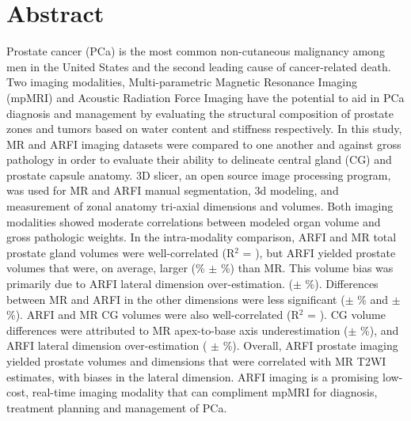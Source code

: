 \section*{Abstract}
Prostate cancer (PCa) is the most common non-cutaneous malignancy among men in
the United States and the second leading cause of cancer-related death.
Two imaging modalities, Multi-parametric Magnetic Resonance Imaging (mpMRI) and
Acoustic Radiation Force Imaging have the potential to aid in PCa
diagnosis and management by evaluating the structural composition of prostate
zones and tumors based on water content and stiffness respectively.  In this study, 
MR and ARFI imaging datasets were compared to one another and against gross pathology in order to evaluate their
ability to delineate central gland (CG) and prostate capsule anatomy. 3D slicer, an open source image processing program,  was used
 for MR and ARFI  manual segmentation, 3d modeling, and measurement of zonal anatomy tri-axial dimensions and volumes.   
 Both imaging modalities showed moderate correlations between
modeled organ volume and gross pathologic weights.  In the intra-modality comparison,
ARFI and MR total prostate gland volumes were well-correlated (R$^2$ = \MRarfiVolTotalRsq), but
ARFI yielded prostate volumes that were, on average, larger
(\MRarfiVolTotalMeanDiff\% $\pm$ \MRarfiVolTotalStdDiff\%) than MR. This volume bias was
primarily due to ARFI lateral dimension over-estimation.
(\ARFImrTotalLatLatMeanPct $\pm$ \ARFImrTotalLatLatStdPct\%). Differences between MR and
ARFI in the other dimensions were less significant (\ARFImrTotalAntPostMeanPct $\pm$
\ARFImrTotalAntPostStdPct\% and \ARFImrTotalApexBaseMeanPct $\pm$
\ARFImrTotalApexBaseStdPct\%). ARFI and MR CG volumes were also
well-correlated (R$^2$ = \MRarfiVolCentralRsq).  CG volume differences were
attributed to MR apex-to-base axis underestimation 
(\ARFImrCentralApexBaseMeanPct $\pm$ \ARFImrCentralApexBaseStdPct\%), and
ARFI lateral dimension over-estimation  (\ARFImrCentralLatLatMeanPct
$\pm$ \ARFImrCentralLatLatStdPct\%).  Overall, ARFI prostate imaging yielded prostate
volumes and dimensions that were correlated with MR T2WI estimates, with biases
in the lateral dimension. ARFI imaging is a promising low-cost, real-time imaging
modality that can compliment mpMRI for diagnosis, treatment planning and
management of PCa.


